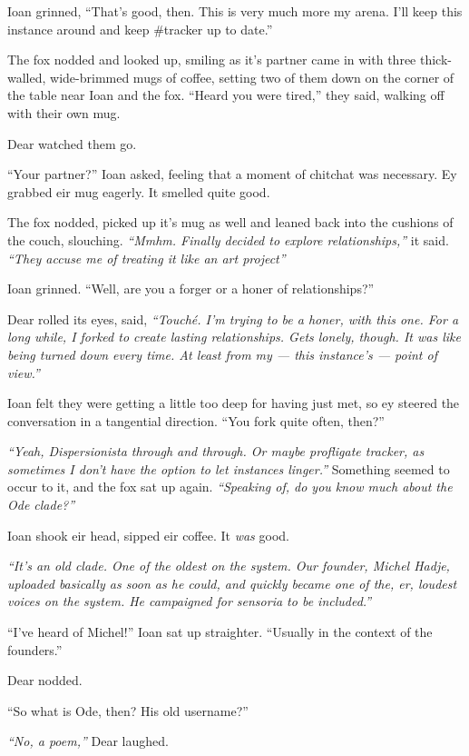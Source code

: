 Ioan grinned, ``That's good, then. This is very much more my arena. I'll keep this instance around and keep \#tracker up to date.''

The fox nodded and looked up, smiling as it's partner came in with three thick-walled, wide-brimmed mugs of coffee, setting two of them down on the corner of the table near Ioan and the fox. ``Heard you were tired,'' they said, walking off with their own mug.

Dear watched them go.

``Your partner?'' Ioan asked, feeling that a moment of chitchat was necessary. Ey grabbed eir mug eagerly. It smelled quite good.

The fox nodded, picked up it's mug as well and leaned back into the cushions of the couch, slouching. \emph{``Mmhm. Finally decided to explore relationships,''} it said. \emph{``They accuse me of treating it like an art project''}

Ioan grinned. ``Well, are you a forger or a honer of relationships?''

Dear rolled its eyes, said, \emph{``Touché. I'm trying to be a honer, with this one. For a long while, I forked to create lasting relationships. Gets lonely, though. It was like being turned down every time. At least from my --- this instance's --- point of view.''}

Ioan felt they were getting a little too deep for having just met, so ey steered the conversation in a tangential direction. ``You fork quite often, then?''

\emph{``Yeah, Dispersionista through and through. Or maybe profligate tracker, as sometimes I don't have the option to let instances linger.''} Something seemed to occur to it, and the fox sat up again. \emph{``Speaking of, do you know much about the Ode clade?''}

Ioan shook eir head, sipped eir coffee. It \emph{was} good.

\emph{``It's an old clade. One of the oldest on the system. Our founder, Michel Hadje, uploaded basically as soon as he could, and quickly became one of the, er, loudest voices on the system. He campaigned for sensoria to be included.''}

``I've heard of Michel!'' Ioan sat up straighter. ``Usually in the context of the founders.''

Dear nodded.

``So what is Ode, then? His old username?''

\emph{``No, a poem,''} Dear laughed.

